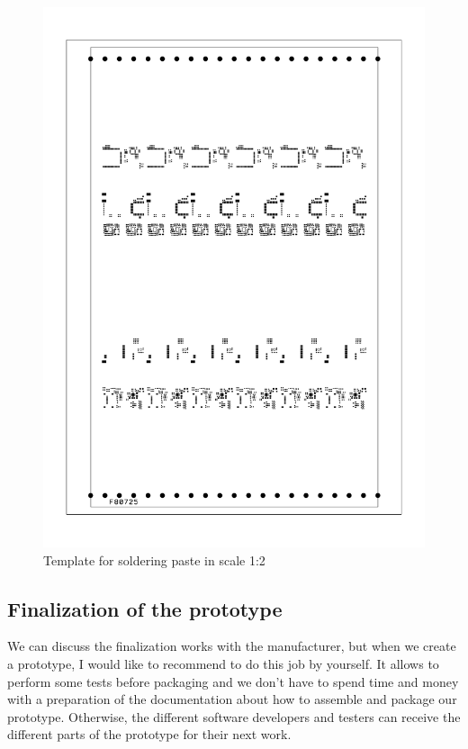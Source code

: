 \begin{figure}
	\centering
	\label{smtPasteTemplate}
	\caption{Template for soldering paste in scale 1:2}
	\includegraphics[angle=90, scale=0.5]{img/smtPasteTemplate.pdf}
\end{figure}

\subsection{Finalization of the prototype}
We can discuss the finalization works with the manufacturer, but when we create a prototype, I would like to recommend to do this job by yourself. It allows to perform some tests before packaging and we don't have to spend time and money with a preparation of the documentation about how to assemble and package our prototype. Otherwise, the different software developers and testers can receive the different parts of the prototype for their next work.

